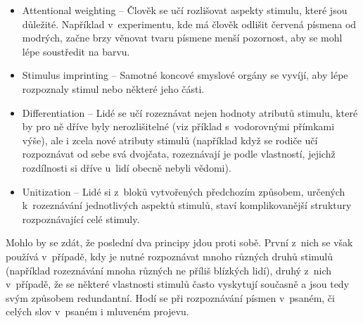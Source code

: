 \begin{itemize}
\item Attentional weighting -- Člověk se učí rozlišovat aspekty stimulu,
které jsou důležité. Například v~experimentu, kde má člověk odlišit červená
písmena od modrých, začne brzy věnovat tvaru písmene menší pozornost, aby se
mohl lépe soustředit na barvu.
\item Stimulus imprinting -- Samotné koncové smyslové orgány se vyvíjí, aby
lépe rozpoznaly stimul nebo některé jeho části.
\item Differentiation -- Lidé se učí rozeznávat nejen hodnoty atributů stimulu,
které by pro ně dříve byly nerozlišitelné (viz příklad s~vodorovnými přímkami výše), ale i zcela nové atributy stimulů (například když se rodiče učí rozpoznávat od sebe svá dvojčata, rozeznávají je podle vlastností, jejichž rozdílnosti si dříve u~lidí obecně nebyli vědomi).
\item Unitization -- Lidé si z~bloků vytvořených předchozím způsobem, určených k~rozeznávání jednotlivých aspektů stimulů, staví komplikovanější struktury rozpoznávající celé stimuly. 
\end{itemize}

Mohlo by se zdát, že poslední dva principy jdou proti sobě. První z~nich se
však používá v~případě, kdy je nutné rozpoznávat mnoho různých druhů stimulů
(například rozeznávání mnoha různých ne příliš blízkých lidí), druhý z~nich
v~případě, že se některé vlastnosti stimulů často vyskytují současně a jsou tedy
svým způsobem redundantní. Hodí se při rozpoznávání písmen v~psaném, či celých
slov v~psaném i mluveném projevu.
